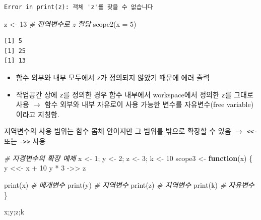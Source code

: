 \documentclass[
  11pt,
]{krantz}
\makeatletter
\newenvironment{Shaded}{\begin{snugshade}}{\end{snugshade}}
\newcommand{\AttributeTok}[1]{\textcolor[rgb]{0.61,0.61,0.61}{#1}}
\newcommand{\CommentTok}[1]{\textcolor[rgb]{0.37,0.37,0.37}{\textit{#1}}}
\newcommand{\ControlFlowTok}[1]{\textcolor[rgb]{0.27,0.27,0.27}{\textbf{#1}}}
\newcommand{\DecValTok}[1]{\textcolor[rgb]{0.06,0.06,0.06}{#1}}
\newcommand{\FunctionTok}[1]{\textcolor[rgb]{0,0,0}{#1}}
\newcommand{\NormalTok}[1]{#1}
\newcommand{\OtherTok}[1]{\textcolor[rgb]{0.37,0.37,0.37}{#1}}
\newcommand{\SpecialCharTok}[1]{\textcolor[rgb]{0,0,0}{#1}}
\providecommand{\tightlist}{%
  \setlength{\itemsep}{0pt}\setlength{\parskip}{0pt}}
\newenvironment{kframe}{%
\medskip{}
\setlength{\fboxsep}{.8em}
 \def\at@end@of@kframe{}%
 \ifinner\ifhmode%
  \def\at@end@of@kframe{\end{minipage}}%
  \begin{minipage}{\columnwidth}%
 \fi\fi%
 \def\FrameCommand##1{\hskip\@totalleftmargin \hskip-\fboxsep
 \colorbox{shadecolor}{##1}\hskip-\fboxsep
     \hskip-\linewidth \hskip-\@totalleftmargin \hskip\columnwidth}%
 \MakeFramed {\advance\hsize-\width
   \@totalleftmargin\z@ \linewidth\hsize
   \@setminipage}}%
 {\par\unskip\endMakeFramed%
 \at@end@of@kframe}
\renewenvironment{quote}{\begin{kframe}}{\end{kframe}}
\makeatother
\begin{document}
\begin{verbatim}
Error in print(z): 객체 'z'를 찾을 수 없습니다
\end{verbatim}

\begin{Shaded}
\begin{Highlighting}[]
\NormalTok{z }\OtherTok{\textless{}{-}} \DecValTok{13} \CommentTok{\# 전역변수로 z 할당}
\FunctionTok{scope2}\NormalTok{(}\AttributeTok{x =} \DecValTok{5}\NormalTok{)}
\end{Highlighting}
\end{Shaded}

\begin{verbatim}
[1] 5
[1] 25
[1] 13
\end{verbatim}

\normalsize

\begin{quote}
\begin{itemize}
\tightlist
\item
  함수 외부와 내부 모두에서 \texttt{z}가 정의되지 않았기 때문에 에러 출력
\item
  작업공간 상에 \texttt{z}를 정의한 경우 함수 내부에서 workspace에서 정의한 \texttt{z}를 그대로 사용 \(\rightarrow\) 함수 외부와 내부 자유로이 사용 가능한 변수를 자유변수(free variable)이라고 지칭함.
\end{itemize}
\end{quote}

지역변수의 사용 범위는 함수 몸체 안이지만 그 범위를 밖으로 확장할 수 있음 \(\rightarrow\) \texttt{\textless{}\textless{}-} 또는 \texttt{-\textgreater{}\textgreater{}} 사용

\footnotesize

\begin{Shaded}
\begin{Highlighting}[]
\CommentTok{\# 지경변수의 확장 예제}
\NormalTok{x }\OtherTok{\textless{}{-}} \DecValTok{1}\NormalTok{; y }\OtherTok{\textless{}{-}} \DecValTok{2}\NormalTok{; z }\OtherTok{\textless{}{-}} \DecValTok{3}\NormalTok{; k }\OtherTok{\textless{}{-}} \DecValTok{10}
\NormalTok{scope3 }\OtherTok{\textless{}{-}} \ControlFlowTok{function}\NormalTok{(x) \{}
\NormalTok{  y }\OtherTok{\textless{}\textless{}{-}}\NormalTok{ x }\SpecialCharTok{+} \DecValTok{10}
\NormalTok{  y }\SpecialCharTok{*} \DecValTok{3} \OtherTok{{-}\textgreater{}\textgreater{}}\NormalTok{ z}
  
  \FunctionTok{print}\NormalTok{(x) }\CommentTok{\# 매개변수}
  \FunctionTok{print}\NormalTok{(y) }\CommentTok{\# 지역변수}
  \FunctionTok{print}\NormalTok{(z) }\CommentTok{\# 지역변수}
  \FunctionTok{print}\NormalTok{(k) }\CommentTok{\# 자유변수}
\NormalTok{\}}

\NormalTok{x;y;z;k}
\end{Highlighting}
\end{Shaded}
\end{document}
